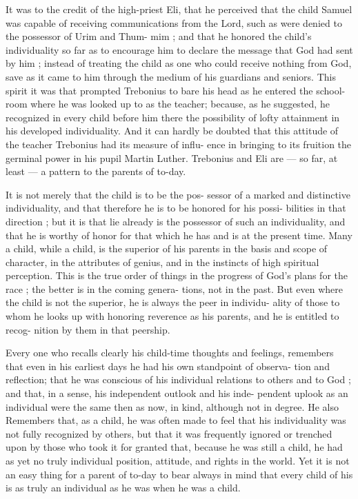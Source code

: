 \documentclass[
]{book}
\begin{document}
It was to the credit of the high-priest Eli, that he perceived that the child Samuel was capable of receiving communications from the Lord, such as were denied to the possessor of Urim and Thum- mim ; and that he honored the child's individuality so far as to encourage him to declare the message that God had sent by him ; instead of treating the child as one who could receive nothing from God, save as it came to him through the medium of his guardians and seniors. This spirit it was that prompted Trebonius to bare his head as he entered the school-room where he was looked up to as the teacher; because, as he suggested, he recognized in every child before him there the possibility of lofty attainment in his developed individuality. And it can hardly be doubted that this attitude of the teacher Trebonius had its measure of influ- ence in bringing to its fruition the germinal power in his pupil Martin Luther. Trebonius and Eli are --- so far, at least --- a pattern to the parents of to-day.

It is not merely that the child is to be the pos- sessor of a marked and distinctive individuality, and that therefore he is to be honored for his possi- bilities in that direction ; but it is that lie already is the possessor of such an individuality, and that he is worthy of honor for that which he has and is at the present time. Many a child, while a child, is the superior of his parents in the basis and scope of character, in the attributes of genius, and in the instincts of high spiritual perception. This is the true order of things in the progress of God's plans for the race ; the better is in the coming genera- tions, not in the past. But even where the child is not the superior, he is always the peer in individu- ality of those to whom he looks up with honoring reverence as his parents, and he is entitled to recog- nition by them in that peership.

Every one who recalls clearly his child-time thoughts and feelings, remembers that even in his earliest days he had his own standpoint of observa- tion and reflection; that he was conscious of his individual relations to others and to God ; and that, in a sense, his independent outlook and his inde- pendent uplook as an individual were the same then as now, in kind, although not in degree. He also Remembers that, as a child, he was often made to feel that his individuality was not fully recognized by others, but that it was frequently ignored or trenched upon by those who took it for granted that, because he was still a child, he had as yet no truly individual position, attitude, and rights in the world. Yet it is not an easy thing for a parent of to-day to bear always in mind that every child of his is as truly an individual as he was when he was a child.
\end{document}
